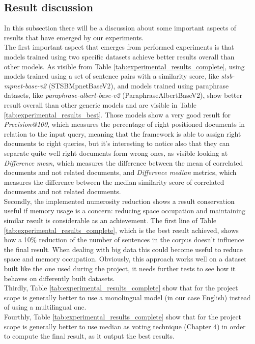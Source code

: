 \documentclass[\main/main.tex]{subfiles}
\begin{document}
\subsection{Result discussion}
In this subsection there will be a discussion about some important aspects of results that have emerged by our experiments. \\
The first important aspect that emerges from performed experiments is that models trained using two specific datasets achieve better results overall than other models. As visible from Table \ref{tab:experimental_results_complete}, using models trained using a set of sentence pairs with a similarity score, like \emph{stsb-mpnet-base-v2} (STSBMpnetBaseV2), and models trained using paraphrase datasets, like \emph{paraphrase-albert-base-v2} (ParaphraseAlbertBaseV2), show better result overall than other generic models and are visible in Table \ref{tab:experimental_results_best}. Those models show a very good result for \emph{Precision@100}, which measures the percentage of right positioned documents in relation to the input query, meaning that the framework is able to assign right documents to right queries, but it's interesting to notice also that they can separate quite well right documents form wrong ones, as visible looking at \emph{Difference mean}, which measures the difference between the mean of correlated documents and not related documents, and \emph{Difference median} metrics, which measures the difference between the median similarity score of correlated documents and not related documents.\\
Secondly, the implemented numerosity reduction shows a result conservation useful if memory usage is a concern: reducing space occupation and maintaining similar result is considerable as an achievement. The first line of Table \ref{tab:experimental_results_complete}, which is the best result achieved, shows how a 10\% reduction of the number of sentences in the corpus doesn't influence the final result. When dealing with big data this could become useful to reduce space and memory occupation. Obviously, this approach works well on a dataset built like the one used during the project, it needs further tests to see how it behaves on differently built datasets.\\
Thirdly, Table \ref{tab:experimental_results_complete} show that for the project scope is generally better to use a monolingual model (in our case English) instead of using a multilingual one.\\
Fourthly, Table \ref{tab:experimental_results_complete} show that for the project scope is generally better to use median as voting technique (Chapter 4) in order to compute the final result, as it output the best results. \\
\end{document}
